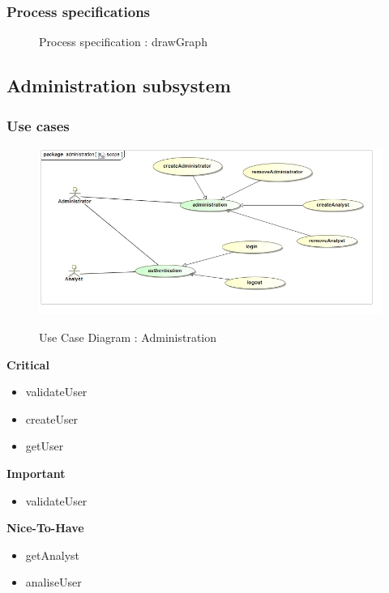 \documentclass{article}
\begin{document}
		\subsubsection{Process specifications}

		\begin{figure}[H]
		\caption{Process specification : drawGraph}
		\end{figure}

	\subsection{Administration subsystem}
		\subsubsection{Use cases}

		\begin{figure}[H]
		\includegraphics[width=\textwidth]{images/uc__administration__scope.jpg}  \\
		\caption{Use Case Diagram : Administration}
		\end{figure}

		\begin{flushleft}
			\textbf{Critical}
				\begin{itemize}
					\item validateUser
					\item createUser
					\item getUser
				\end{itemize}
			\textbf{Important}
				\begin{itemize}
					\item validateUser
				\end{itemize}

			\textbf{Nice-To-Have}
				\begin{itemize}
					\item getAnalyst
					\item analiseUser
				\end{itemize}
		\end{flushleft}
\end{document}
